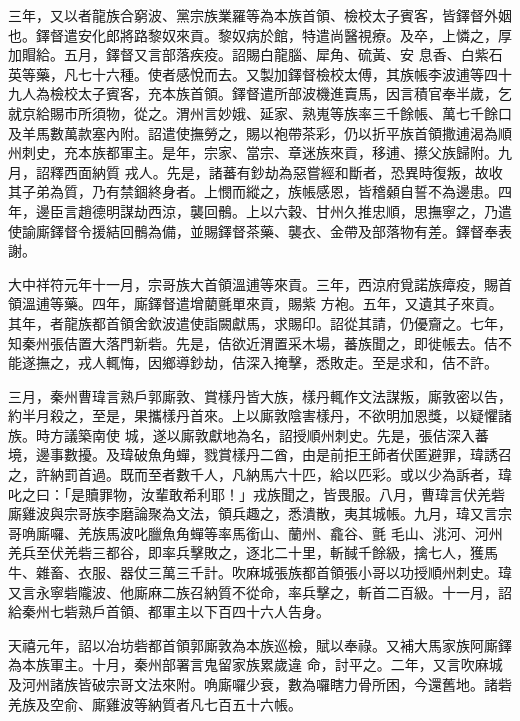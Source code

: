 \begin{pinyinscope}
 三年，又以者龍族合窮波、黨宗族業羅等為本族首領、檢校太子賓客，皆鐸督外姻也。鐸督遣安化郎將路黎奴來貢。黎奴病於館，特遣尚醫視療。及卒，上憐之，厚加賵給。五月，鐸督又言部落疾疫。詔賜白龍腦、犀角、硫黃、安
 息香、白紫石英等藥，凡七十六種。使者感悅而去。又製加鐸督檢校太傅，其族帳李波逋等四十九人為檢校太子賓客，充本族首領。鐸督遣所部波機進賣馬，因言積官奉半歲，乞就京給賜市所須物，從之。渭州言妙娥、延家、熟嵬等族率三千餘帳、萬七千餘口及羊馬數萬款塞內附。詔遣使撫勞之，賜以袍帶茶彩，仍以折平族首領撒逋渴為順州刺史，充本族都軍主。是年，宗家、當宗、章迷族來貢，移逋、攃父族歸附。九月，詔釋西面納質
 戎人。先是，諸蕃有鈔劫為惡嘗經和斷者，恐異時復叛，故收其子弟為質，乃有禁錮終身者。上憫而縱之，族帳感恩，皆稽顙自誓不為邊患。四年，邊臣言趙德明謀劫西涼，襲回鶻。上以六穀、甘州久推忠順，思撫寧之，乃遣使諭廝鐸督令援結回鶻為備，並賜鐸督茶藥、襲衣、金帶及部落物有差。鐸督奉表謝。



 大中祥符元年十一月，宗哥族大首領溫逋等來貢。三年，西涼府覓諾族瘴疫，賜首領溫逋等藥。四年，廝鐸督遣增藺氈單來貢，賜紫
 方袍。五年，又遺其子來貢。其年，者龍族都首領舍欽波遣使詣闕獻馬，求賜印。詔從其請，仍優齎之。七年，知秦州張佶置大落門新砦。先是，佶欲近渭置采木場，蕃族聞之，即徙帳去。佶不能遂撫之，戎人輒悔，因鄉導鈔劫，佶深入掩擊，悉敗走。至是求和，佶不許。



 三月，秦州曹瑋言熟戶郭廝敦、賞樣丹皆大族，樣丹輒作文法謀叛，廝敦密以告，約半月殺之，至是，果攜樣丹首來。上以廝敦陰害樣丹，不欲明加恩獎，以疑懼諸族。時方議築南使
 城，遂以廝敦獻地為名，詔授順州刺史。先是，張佶深入蕃境，邊事數擾。及瑋破魚角蟬，戮賞樣丹二酋，由是前拒王師者伏匿避罪，瑋誘召之，許納罰首過。既而至者數千人，凡納馬六十匹，給以匹彩。或以少為訴者，瑋叱之曰：「是贖罪物，汝輩敢希利耶！」戎族聞之，皆畏服。八月，曹瑋言伏羌砦廝雞波與宗哥族李磨論聚為文法，領兵趣之，悉潰散，夷其城帳。九月，瑋又言宗哥唃廝囉、羌族馬波叱臘魚角蟬等率馬銜山、蘭州、龕谷、氈
 毛山、洮河、河州羌兵至伏羌砦三都谷，即率兵擊敗之，逐北二十里，斬馘千餘級，擒七人，獲馬牛、雜畜、衣服、器仗三萬三千計。吹麻城張族都首領張小哥以功授順州刺史。瑋又言永寧砦隴波、他廝麻二族召納質不從命，率兵擊之，斬首二百級。十一月，詔給秦州七砦熟戶首領、都軍主以下百四十六人告身。



 天禧元年，詔以冶坊砦都首領郭廝敦為本族巡檢，賦以奉祿。又補大馬家族阿廝鐸為本族軍主。十月，秦州部署言鬼留家族累歲違
 命，討平之。二年，又言吹麻城及河州諸族皆破宗哥文法來附。唃廝囉少衰，數為囉瞎力骨所困，今還舊地。諸砦羌族及空俞、廝雞波等納質者凡七百五十六帳。




\end{pinyinscope}
